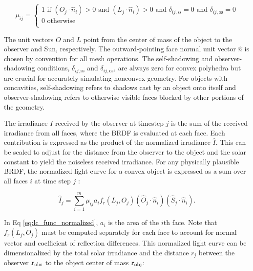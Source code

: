 \begin{equation} \label{eq:cvx_shadow_cond}
  \mu_{ij} = \begin{cases}
    1 \text{ if } \left( O_j \cdot \hat{n}_i \right) > 0 \text{ and } \left( L_j \cdot \hat{n}_i \right) > 0 
	  \text{ and } \delta_{ij,\text{ss}} = 0 \text{ and } \delta_{ij,\text{os}} = 0\\
    0 \text{ otherwise } \\
  \end{cases}
\end{equation}

The unit vectors $O$ and $L$ point from the center of mass of the object to the observer and Sun, respectively. The outward-pointing face normal unit vector $\hat{n}$ is chosen by convention for all mesh operations. 
The self-shadowing and observer-shadowing conditions, $\delta_{ij,\text{ss}}$ and $\delta_{ij,\text{os}}$, 
are always zero for convex polyhedra but are crucial for accurately simulating nonconvex geometry. 
For objects with concavities, self-shadowing refers to shadows cast by an object onto itself and observer-shadowing 
refers to otherwise visible faces blocked by other portions of the geometry.

The irradiance $I$ received by the observer at timestep $j$ is the sum of the received irradiance from all faces, where the BRDF is evaluated at each face. Each contribution is expressed as the product of the
normalized irradiance $\hat{I}$. This can be scaled to adjust for the distance from the observer to
the object and the solar constant to yield the noiseless received irradiance. For any physically plausible BRDF, the normalized light curve for a convex object is expressed as a sum over all faces $i$ at time step $j$ \cite{fan2020thesis}:

\begin{equation} \label{eq:lc_func_normalized}
  \hat{I}_{j} = \sum_{i=1}^{m}{\mu_{ij} a_i f_r(L_j, O_j) \left( \hat{O}_j \cdot \hat{n}_i \right) \left( \hat{S}_j \cdot \hat{n}_i \right)}.
\end{equation}

In Eq \ref{eq:lc_func_normalized}, $a_i$ is the area of the $i$th face. Note that $f_r(L_j, O_j)$ must be computed separately for each face to account for normal vector and coefficient of reflection differences. This normalized light curve can be dimensionalized by the total solar irradiance and the distance $r_j$ between the observer $\mathbf{r}_\mathrm{obs}$ to the object center of mass $\mathbf{r}_\mathrm{obj}$:

